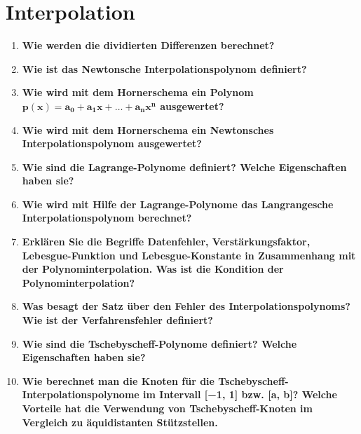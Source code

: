 \documentclass[10pt,a4paper]{article}
\begin{document}
	\section{Interpolation}
	\begin{enumerate}
		\item \textbf{Wie werden die dividierten Differenzen berechnet?} \\
		
		\item \textbf{Wie ist das Newtonsche Interpolationspolynom definiert?} \\
		
		\item \textbf{Wie wird mit dem Hornerschema ein Polynom $\pmb{p(x)=a_0+a_1x+\dots +a_nx^n}$ ausgewertet?} \\
		
		\item \textbf{Wie wird mit dem Hornerschema ein Newtonsches Interpolationspolynom ausgewertet?} \\
		
		\item \textbf{Wie sind die Lagrange-Polynome definiert? Welche Eigenschaften haben sie?} \\
		
		\item \textbf{Wie wird mit Hilfe der Lagrange-Polynome das Langrangesche Interpolationspolynom berechnet?} \\
		
		\item \textbf{Erklären Sie die Begriffe Datenfehler, Verstärkungsfaktor, Lebesgue-Funktion und Lebesgue-Konstante in Zusammenhang mit der Polynominterpolation. Was ist die Kondition der Polynominterpolation?} \\
		
		\item \textbf{Was besagt der Satz über den Fehler des Interpolationspolynoms? Wie ist der Verfahrensfehler definiert?} \\
		
		\item \textbf{Wie sind die Tschebyscheff-Polynome definiert? Welche Eigenschaften haben sie?} \\
		
		\item \textbf{Wie berechnet man die Knoten für die Tschebyscheff-Interpolationspolynome im Intervall [−1, 1] bzw. [a, b]? Welche Vorteile hat die Verwendung von Tschebyscheff-Knoten im Vergleich zu äquidistanten Stützstellen.} \\
		

\end{enumerate}
\end{document}
